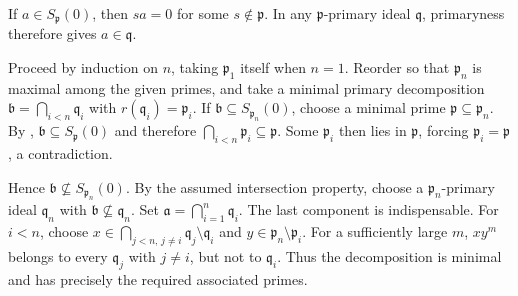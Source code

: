 If $a\in S_{\mathfrak{p}}(0)$, then $sa=0$ for some $s\notin\mathfrak{p}$. In any $\mathfrak{p}$-primary ideal $\mathfrak{q}$, primaryness therefore gives $a\in\mathfrak{q}$.

Proceed by induction on $n$, taking $\mathfrak{p}_1$ itself when $n=1$. Reorder so that $\mathfrak{p}_n$ is maximal among the given primes, and take a minimal primary decomposition $\mathfrak{b}=\bigcap_{i<n}\mathfrak{q}_i$ with $r(\mathfrak{q}_i)=\mathfrak{p}_i$. If $\mathfrak{b}\subseteq S_{\mathfrak{p}_n}(0)$, choose a minimal prime $\mathfrak{p}\subseteq\mathfrak{p}_n$. By , $\mathfrak{b}\subseteq S_{\mathfrak{p}}(0)$ and therefore $\bigcap_{i<n}\mathfrak{p}_i\subseteq\mathfrak{p}$. Some $\mathfrak{p}_i$ then lies in $\mathfrak{p}$, forcing $\mathfrak{p}_i=\mathfrak{p}$, a contradiction.

Hence $\mathfrak{b}\not\subseteq S_{\mathfrak{p}_n}(0)$. By the assumed intersection property, choose a $\mathfrak{p}_n$-primary ideal $\mathfrak{q}_n$ with $\mathfrak{b}\not\subseteq\mathfrak{q}_n$. Set $\mathfrak{a}=\bigcap_{i=1}^n\mathfrak{q}_i$. The last component is indispensable. For $i<n$, choose $x\in\bigcap_{j<n,\,j\ne i}\mathfrak{q}_j\setminus\mathfrak{q}_i$ and $y\in\mathfrak{p}_n\setminus\mathfrak{p}_i$. For a sufficiently large $m$, $xy^m$ belongs to every $\mathfrak{q}_j$ with $j\ne i$, but not to $\mathfrak{q}_i$. Thus the decomposition is minimal and has precisely the required associated primes.
